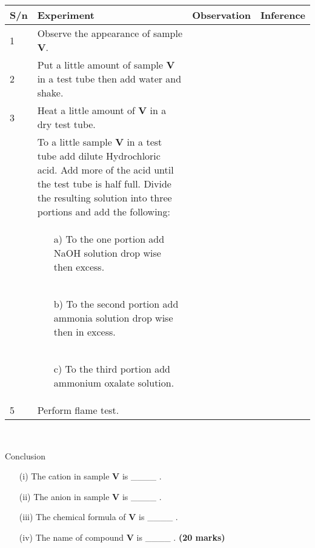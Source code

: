 \begin{center}
\begin{tabular}{|l|p{8cm}|l|l|}
\hline
\textbf{S/n}&\textbf{Experiment}&\textbf{Observation}&\textbf{Inference}\\ \hline
1&Observe the appearance of sample \textbf{V}.&&\\ \hline
2&Put a little amount of sample \textbf{V} in a test tube then add water and shake.&&\\ \hline
3&Heat a little amount of \textbf{V} in a dry test tube.&&\\ \hline
{\multirow{4}{*}{4}}&To a little sample \textbf{V} in a test tube add dilute Hydrochloric acid. Add more of the acid until the test tube is half full. Divide the resulting solution into three portions and add the following:&&\\ \cline{2-4}
&\begin{enumerate}
\item[a)] To the one portion add NaOH solution drop wise then excess.
\end{enumerate}&&\\ \cline{2-4}
&\begin{enumerate}
\item[b)] To the second portion add ammonia solution drop wise then in excess.
\end{enumerate}&&\\ \cline{2-4}
&\begin{enumerate}
\item[c)] To the third portion add ammonium oxalate solution.
\end{enumerate}&&\\ \hline
5&Perform flame test.&&\\ \hline
\end{tabular}\\

\end{center}

Conclusion\\

\begin{enumerate}
\item[(i)] The cation in sample \textbf{V} is \_\_\_\_ .\\
\item[(ii)] The anion in sample \textbf{V} is \_\_\_\_ .\\
\item[(iii)] The chemical formula of \textbf{V} is \_\_\_\_ .\\
\item[(iv)] The name of compound \textbf{V} is \_\_\_\_ . \hfill \textbf{(20 marks)} \\
\end{enumerate}

